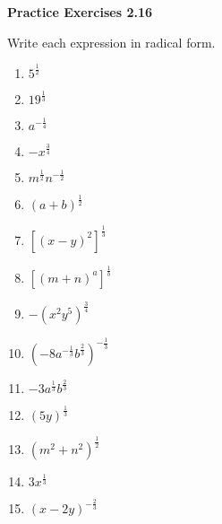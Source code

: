 \vspace{1ex}
\noindent\textbf{Practice Exercises 2.16}

\vspace{0.75ex}

Write each expression in radical form.

\begin{multicols}{3}
\begin{enumerate}[noitemsep, label = \color{blue}\arabic*. ]
\item $5^{\tfrac{1}{2}}$
\item $19^{\tfrac{1}{3}}$
\item $a^{-\tfrac{1}{4}}$
\item $-x^{\tfrac{3}{4}}$
\item $m^{\tfrac{1}{2}}n^{-\tfrac{1}{2}}$
\item $\left(a+b \right)^{\tfrac{1}{2}}$
\item $\left[(x-y)^{2}\right]^{\tfrac{1}{3}}$
\item $\left[(m+n)^{a}\right]^{\tfrac{1}{b}}$
\item $-\left( x^{2}y^{5} \right)^{\tfrac{3}{4}}$
\item $\left( -8 a^{-\tfrac{1}{3}}b^{\tfrac{2}{3}} \right)^{-\tfrac{1}{3}}$
\item $-3 a^{\tfrac{1}{3}}b^{\tfrac{2}{3}}$ 
\item $\left( 5y \right)^{\tfrac{1}{3}}$
\item $\left( m^{2}+ n^{2} \right)^{\tfrac{1}{2}}$
\item $3 x^{\tfrac{1}{3}}$
\item $\left( x-2y \right)^{-\tfrac{2}{3}}$
\end{enumerate}
\end{multicols}
